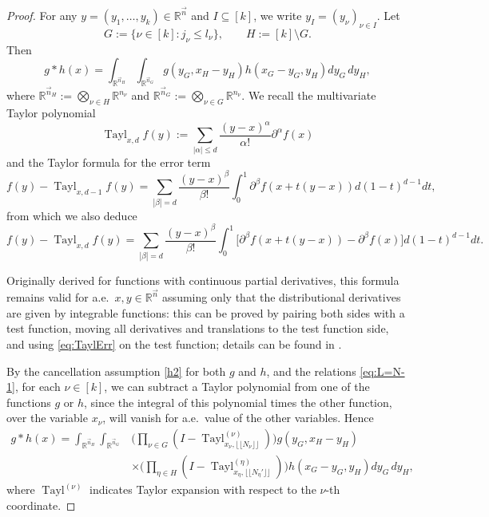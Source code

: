 \documentclass[11pt, reqno]{amsart}
\theoremstyle{definition}
\theoremstyle{remark}
\numberwithin{equation}{section}
\newcommand{\R}{\mathbb R}
\newcommand{\vn}{\vec n}
\newcommand{\abs}[1]{|#1|}
\begin{document}
\begin{proof}
For any $y=(y_1,\ldots,y_k)\in\R^{\vn}$ and $I\subseteq[k]$,
we write $y_I=(y_\nu)_{\nu\in I}$. Let
\begin{equation*}
  G:=\{\nu\in[k]:j_\nu\leq l_\nu\},\qquad H:=[k]\setminus G.
\end{equation*}
Then
\begin{equation*}
  g*h(x)=\int_{\R^{\vn_{H}}} \int_{\R^{\vn_{G}}} g(y_G,x_H-y_H)h(x_G-y_G,y_H)dy_G\,dy_H,
\end{equation*}
where $\R^{\vn_{H}}:=\bigotimes_{\nu\in H} \R^{n_{\nu}}$
and $\R^{\vn_{G}}:=\bigotimes_{\nu\in G} \R^{n_{\nu}}$.
We recall the multivariate Taylor polynomial
\begin{equation*}
    \operatorname{Tayl}_{x,d}f(y) :=\sum_{\abs{\alpha}\leq d}\frac{(y-x)^\alpha}{\alpha !}\partial^\alpha f(x)
\end{equation*}
and the Taylor formula for the error term
\begin{equation}\label{eq:TaylErr}
f(y)-\operatorname{Tayl}_{x,d-1}f(y) =\sum_{\abs{\beta}=d}\frac{(y-x)^\beta}{\beta!}\int_0^1 \partial^\beta f(x+t(y-x)) d(1-t)^{d-1}dt,
\end{equation}
from which we also deduce
\begin{equation}\label{eq:TaylErr2}
f(y)-\operatorname{Tayl}_{x,d}f(y) =\sum_{\abs{\beta}=d}\frac{(y-x)^\beta}{\beta!}\int_0^1 \big[\partial^\beta f(x+t(y-x))-\partial^\beta f(x)\big] d(1-t)^{d-1}dt.
\end{equation}

Originally derived for functions with continuous partial derivatives, this formula remains valid for a.e.\ $x,y\in\R^{\vn}$ assuming only that the distributional derivatives are given by integrable functions: this can be proved by pairing both sides with a test function, moving all derivatives and translations to the test function side, and using \eqref{eq:TaylErr} on the test function; details can be found in \cite{Anas}.

By the cancellation assumption \eqref{h2} for both $g$ and $h$, and the relations \eqref{eq:L=N-1}, for each $\nu\in[k]$, we can subtract a Taylor polynomial from one of the functions $g$ or $h$, since the integral of this polynomial times the other function, over the variable $x_\nu$, will vanish for a.e.\ value of the other variables. Hence
\begin{equation}\label{eq:g*h2}
\begin{split}
  g*h(x)=\int_{\R^{\vn_{H}}} \int_{\R^{\vn_{G}}}  &\Big(\prod_{\nu\in G}(I-\operatorname{Tayl}_{x_\nu,\lfloor\!\lfloor N_\nu\rfloor\!\rfloor}^{(\nu)})\Big)g(y_G,x_H-y_H) \\
  &\times  \Big(\prod_{\eta\in H}(I-\operatorname{Tayl}_{x_\eta,\lfloor\!\lfloor N_\eta'\rfloor\!\rfloor}^{(\eta)})\Big)h(x_G-y_G,y_H)dy_G\,dy_H,
\end{split}
\end{equation}
where $\operatorname{Tayl}^{(\nu)}$ indicates Taylor expansion with respect to the $\nu$-th coordinate.


\end{proof}
\end{document}
